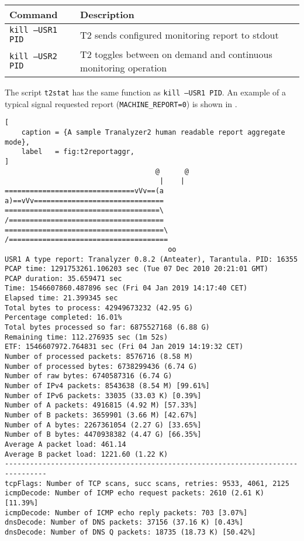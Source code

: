 \begin{longtable}{ll}
    \toprule
    {\bf Command} & {\bf Description}\\
    \midrule\endhead%
    {\tt kill --USR1 PID} & T2 sends configured monitoring report to stdout \\
    {\tt kill --USR2 PID} & T2 toggles between on demand and continuous monitoring operation \\
    \bottomrule
\end{longtable}
The script {\tt t2stat} has the same function as {\tt kill --USR1 PID}.
An example of a typical signal requested report ({\tt MACHINE\_REPORT=0}) is shown in .

\begin{lstlisting}[
    caption = {A sample Tranalyzer2 human readable report aggregate mode},
    label   = fig:t2reportaggr,
]
                                    @      @
                                     |    |
===============================vVv==(a    a)==vVv===============================
=====================================\    /=====================================
======================================\  /======================================
                                       oo
USR1 A type report: Tranalyzer 0.8.2 (Anteater), Tarantula. PID: 16355
PCAP time: 1291753261.106203 sec (Tue 07 Dec 2010 20:21:01 GMT)
PCAP duration: 35.659471 sec
Time: 1546607860.487896 sec (Fri 04 Jan 2019 14:17:40 CET)
Elapsed time: 21.399345 sec
Total bytes to process: 42949673232 (42.95 G)
Percentage completed: 16.01%
Total bytes processed so far: 6875527168 (6.88 G)
Remaining time: 112.276935 sec (1m 52s)
ETF: 1546607972.764831 sec (Fri 04 Jan 2019 14:19:32 CET)
Number of processed packets: 8576716 (8.58 M)
Number of processed bytes: 6738299436 (6.74 G)
Number of raw bytes: 6740587316 (6.74 G)
Number of IPv4 packets: 8543638 (8.54 M) [99.61%]
Number of IPv6 packets: 33035 (33.03 K) [0.39%]
Number of A packets: 4916815 (4.92 M) [57.33%]
Number of B packets: 3659901 (3.66 M) [42.67%]
Number of A bytes: 2267361054 (2.27 G) [33.65%]
Number of B bytes: 4470938382 (4.47 G) [66.35%]
Average A packet load: 461.14
Average B packet load: 1221.60 (1.22 K)
--------------------------------------------------------------------------------
tcpFlags: Number of TCP scans, succ scans, retries: 9533, 4061, 2125
icmpDecode: Number of ICMP echo request packets: 2610 (2.61 K) [11.39%]
icmpDecode: Number of ICMP echo reply packets: 703 [3.07%]
dnsDecode: Number of DNS packets: 37156 (37.16 K) [0.43%]
dnsDecode: Number of DNS Q packets: 18735 (18.73 K) [50.42%]

\end{lstlisting}
